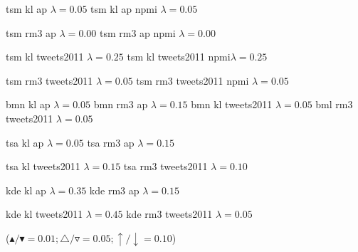 \documentclass{sig-alternate}
\begin{document}
tsm kl ap $\lambda=0.05$
tsm kl ap npmi $\lambda=0.05$

tsm rm3 ap $\lambda=0.00$
tsm rm3 ap npmi $\lambda=0.00$

tsm kl tweets2011 $\lambda=0.25$
tsm kl tweets2011 npmi$\lambda=0.25$

tsm rm3 tweets2011 $\lambda=0.05$
tsm rm3 tweets2011 npmi $\lambda=0.05$

bmn kl ap $\lambda=0.05$
bmn rm3 ap $\lambda=0.15$
bmn kl tweets2011 $\lambda=0.05$
bml  rm3 tweets2011 $\lambda=0.05$

tsa kl ap $\lambda=0.05$
tsa rm3 ap $\lambda=0.15$

tsa kl tweets2011 $\lambda=0.15$
tsa rm3 tweets2011 $\lambda=0.10$

kde kl ap $\lambda=0.35$
kde rm3 ap $\lambda=0.15$

kde kl tweets2011 $\lambda=0.45$
kde rm3 tweets2011 $\lambda=0.05$


($\blacktriangle/\blacktriangledown = 0.01; \triangle/\triangledown = 0.05; \uparrow/\downarrow = 0.10$)
\end{document}
